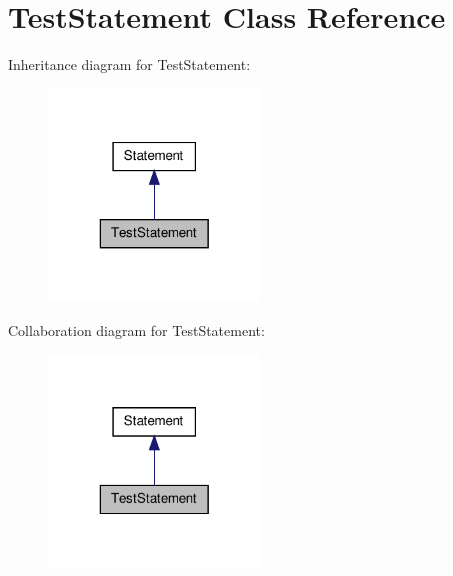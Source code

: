 \hypertarget{class_test_statement}{\section{Test\-Statement Class Reference}
\label{class_test_statement}
}


Inheritance diagram for Test\-Statement\-:
\nopagebreak
\begin{figure}[H]
\begin{center}
\leavevmode
\includegraphics[width=160pt]{class_test_statement__inherit__graph}
\end{center}
\end{figure}


Collaboration diagram for Test\-Statement\-:
\nopagebreak
\begin{figure}[H]
\begin{center}
\leavevmode
\includegraphics[width=160pt]{class_test_statement__coll__graph}
\end{center}
\end{figure}
